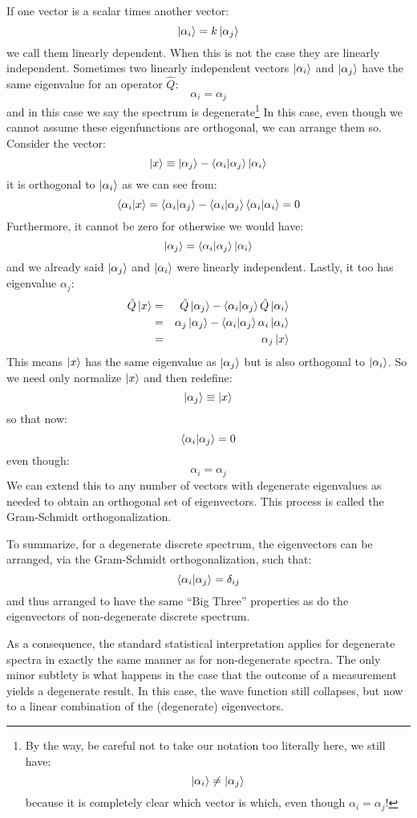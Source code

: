 \documentclass[12pt]{book}
\begin{document}
If one vector is a scalar times another vector:
$$\ket{\alpha_i} = k \ket{\alpha_j}$$
we call them linearly dependent.  When this is not the case they are linearly independent.
Sometimes two linearly independent vectors $\ket{\alpha_i}$ and $\ket{\alpha_j}$ have the same eigenvalue for an operator $\hat{Q}$:
$$\alpha_i = \alpha_j$$
and in this case we say the spectrum is degenerate\footnote{By the way, be careful not to take our notation too literally here, we still have:
$$\ket{\alpha_i} \neq \ket{\alpha_j}$$
because it is completely clear which vector is which, even though $\alpha_i=\alpha_j$!}
In this case, even though we cannot assume these eigenfunctions are orthogonal, we can arrange them so.  Consider the vector:
$$\ket{x} \equiv \ket{\alpha_j} - \braket{\alpha_i|\alpha_j}\ket{\alpha_i}$$
it is orthogonal to $\ket{\alpha_i}$ as we can see from:
$$\braket{\alpha_i| x} = \braket{\alpha_i | \alpha_j} - \braket{\alpha_i|\alpha_j} \braket{\alpha_i|\alpha_i} = 0$$
Furthermore, it cannot be zero for otherwise we would have:
$$\ket{\alpha_j} = \braket{\alpha_i|\alpha_j}\ket{\alpha_i}$$
and we already said $\ket{\alpha_j}$ and $\ket{\alpha_i}$ were linearly independent.
Lastly, it too has eigenvalue $\alpha_j$:
\begin{eqnarray*}
\hat{Q}\ket{x} &=& \hat{Q}\ket{\alpha_j} - \braket{\alpha_i|\alpha_j}\hat{Q}\ket{\alpha_i}\\
&=&\alpha_j \ket{\alpha_j} - \braket{\alpha_i|\alpha_j} \alpha_i \ket{\alpha_i}\\
&=& \alpha_j \ket{x}\\
\end{eqnarray*}
This means $\ket{x}$ has the same eigenvalue as $\ket{\alpha_j}$ but is also orthogonal to $\ket{\alpha_i}$.  So we need only normalize $\ket{x}$ and then redefine:
$$\ket{\alpha_j} \equiv \ket{x}$$
so that now:
$$\braket{\alpha_i | \alpha_j} = 0$$
even though:
$$\alpha_i = \alpha_j$$
We can extend this to any number of vectors with degenerate eigenvalues as needed to obtain an orthogonal set of eigenvectors.  This process is called the Gram-Schmidt orthogonalization. 

To summarize, for a degenerate discrete spectrum, the eigenvectors can be arranged, via the Gram-Schmidt orthogonalization, such that:
$$\braket{\alpha_i | \alpha_j} = \delta_{ij}$$
and thus arranged to have the same ``Big Three'' properties as do the eigenvectors of non-degenerate discrete spectrum.

As a consequence, the standard statistical interpretation applies for degenerate spectra in exactly the same manner as for non-degenerate spectra.  The only minor subtlety is what happens in the case that the outcome of a measurement yields a degenerate result.  In this case, the wave function still collapses, but now to a linear combination of the (degenerate) eigenvectors.
\end{document}
